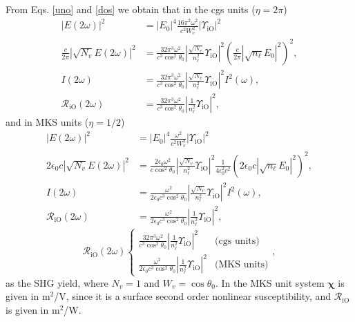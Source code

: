\documentclass[10pt]{book}
\begin{document}
From Eqs. \eqref{uno} and \eqref{dos} we obtain that
in the cgs units ($\eta=2\pi$)
\begin{align}\label{r01}
|E(2\omega)|^2 
&= |E_{0}|^4\frac{16\pi^{2}\omega^{2}}{c^{2}W^2_v}
\left\vert  
\Upsilon_{\mathrm{iO}}
\right\vert^{2}
\nonumber\\
\frac{c}{2\pi}|\sqrt{N_v}E(2\omega)|^{2} 
&=
\frac{32\pi^{3}\omega^{2}}{c^{3}\cos^2\theta_0}
\left\vert  
\frac{\sqrt{N_v}}{n^2_\ell}
\Upsilon_{\mathrm{iO}}
\right\vert^{2} 
\left(\frac{c}{2\pi}|\sqrt{n_\ell}E_{0}|^{2}\right)^{2},
\nonumber\\ 
I(2\omega) 
&= \frac{32\pi^{3}\omega^{2}}{c^{3}\cos^2\theta_0}
\left\vert  
\frac{\sqrt{N_v}}{n^2_\ell}
\Upsilon_{\mathrm{iO}}
\right\vert^{2}I^{2}(\omega),
\nonumber\\
\mathcal{R}_{\mathrm{iO}}(2\omega) 
&= 
\frac{32\pi^{3}\omega^{2}}{c^{3}\cos^2\theta_0}
\left\vert  
\frac{1}{n^2_\ell}
\Upsilon_{\mathrm{iO}}
\right\vert^{2}
,
\end{align} 
and in MKS units ($\eta=1/2$)
\begin{align}\label{r01m}
|E(2\omega)|^2 
&= |E_{0}|^4
\frac{\omega^{2}}{c^{2}W^2_v}
\left\vert  
\Upsilon_{\mathrm{iO}}
\right\vert^{2}
\nonumber\\
2\epsilon_{0}c|\sqrt{N_v}E(2\omega)|^{2} 
&=
\frac{2\epsilon_{0}\omega^{2}}{c\cos^2\theta_0}
\left\vert  
\frac{\sqrt{N_v}}{n^2_\ell}
\Upsilon_{\mathrm{iO}}
\right\vert^{2} 
\frac{1}{4\epsilon^2_0c^2}\left(2\epsilon_{0}c|\sqrt{n_\ell}E_{0}|^{2}\right)^{2},
\nonumber\\ 
I(2\omega) 
&= 
\frac{\omega^{2}}{2\epsilon_{0}c^3\cos^2\theta_0}
\left\vert  
\frac{\sqrt{N_v}}{n^2_\ell}
\Upsilon_{\mathrm{iO}}
\right\vert^{2}I^{2}(\omega),
\nonumber\\
\mathcal{R}_{\mathrm{iO}}(2\omega) 
&= \frac{\omega^{2}}{2\epsilon_{0}c^3\cos^2\theta_0}
\left\vert  
\frac{1}{n^2_\ell}
\Upsilon_{\mathrm{iO}}
\right\vert^{2} 
,
\end{align} 
\begin{equation}\label{mc6}
\mathcal{R}_{\mathrm{iO}}(2\omega) 
\left\{
\begin{array}{cc} 
\frac{32\pi^{3}\omega^{2}}{c^{3}\cos^2\theta_0}
\left\vert  
\frac{1}{n^2_\ell}
\Upsilon_{\mathrm{iO}}
\right\vert^{2} 
& \text{(cgs units)} \\
\frac{\omega^{2}}{2\epsilon_{0}c^3\cos^2\theta_0}
\left\vert  
\frac{1}{n^2_\ell}
\Upsilon_{\mathrm{iO}}
\right\vert^{2} 
& \text{(MKS units)} 
\end{array}
\right.
,
\end{equation}
as the SHG yield, where $N_v=1$ and $W_v=\cos\theta_0$.
In the MKS unit system $\boldsymbol{\chi}$ is given in m$^2$/V, since
it is a surface second order nonlinear susceptibility, and
$\mathcal{R}_{\mathrm{iO}}$ is given in m$^2$/W. 
\end{document}
